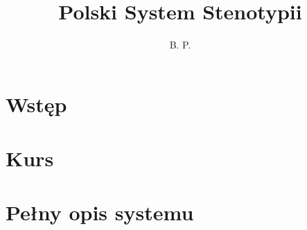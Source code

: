 \documentclass[12p, oneside]{book}
\begin{document}
\frontmatter

\title{Polski System Stenotypii}

\author{B. P.}
\maketitle
\newpage

\tableofcontents

\chapter{Wstęp}
\chapter{Kurs}
\chapter{Pełny opis systemu}
\end{document}
